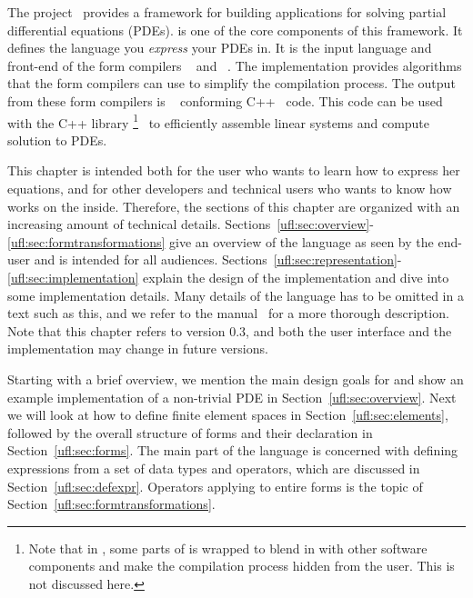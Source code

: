 The \fenics{} project~\cite{DupHof2003,www:fenics,Log2007} provides a framework for
building applications for solving partial differential equations (PDEs).
\ufl{} is one of the core components of this framework.
It defines the language you \emph{express} your PDEs in.
It is the input language and front-end of the form compilers
\ffc{}~\cite{KirLog2006,KirLog2007,manual:ffc,www:ffc,OelLog2008,OelWel2009}
and \sfc{}~\cite{www:syfi,manual:syfi}.  The \ufl{} implementation
provides algorithms that the form compilers can use to simplify the
compilation process.  The output from these form compilers is
\ufc{}~\cite{www:ufc,manual:ufc,AlnLog2009} conforming
C++~\cite{Str1997} code. This code can be used with the C++ library
\dolfin{}\footnote{Note that in \pydolfin{}, some parts of \ufl{} is
wrapped to blend in with other software components and make the
compilation process hidden from the user.  This is not discussed
here.}~\cite{LogWel2009,www:dolfin,manual:dolfin} to efficiently
assemble linear systems and compute solution to PDEs.

This chapter is intended both for the \fenics{} user who wants to
learn how to express her equations, and for other \fenics{} developers
and technical users who wants to know how \ufl{} works on the inside.
Therefore, the sections of this chapter are organized with an
increasing amount of technical details.
Sections~\ref{ufl:sec:overview}-\ref{ufl:sec:formtransformations} give
an overview of the language as seen by the end-user and is intended
for all audiences.
Sections~\ref{ufl:sec:representation}-\ref{ufl:sec:implementation}
explain the design of the implementation and dive into some
implementation details.  Many details of the language has to be
omitted in a text such as this, and we refer to the \ufl{}
manual~\cite{manual:ufl} for a more thorough description. Note that
this chapter refers to \ufl{} version 0.3, and both the user interface
and the implementation may change in future versions.

Starting with a brief overview, we mention the main design goals for
\ufl{} and show an example implementation of a non-trivial PDE in
Section~\ref{ufl:sec:overview}.  Next we will look at how to define
finite element spaces in Section~\ref{ufl:sec:elements}, followed by
the overall structure of forms and their declaration in
Section~\ref{ufl:sec:forms}.  The main part of the language is
concerned with defining expressions from a set of data types and
operators, which are discussed in Section~\ref{ufl:sec:defexpr}.
Operators applying to entire forms is the topic of
Section~\ref{ufl:sec:formtransformations}.


